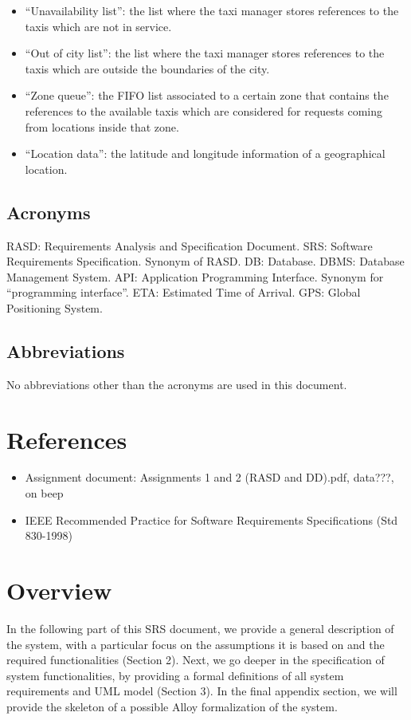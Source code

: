\begin{itemize}
\item “Unavailability list”: the list where the taxi manager stores references to the taxis which are not in service.
\item “Out of city list”: the list where the taxi manager stores references to the taxis which are outside the boundaries of the city. 
\item “Zone queue”: the FIFO list associated to a certain zone that contains the references to the available taxis which are considered for requests coming from locations inside that zone. 
\item “Location data”: the latitude and longitude information of a geographical location.
\end{itemize}


\subsection{Acronyms}
RASD: Requirements Analysis and Specification Document.
SRS: Software Requirements Specification. Synonym of RASD.
DB: Database.
DBMS: Database Management System.
API: Application Programming Interface. Synonym for “programming interface”.
ETA: Estimated Time of Arrival.
GPS: Global Positioning System.


\subsection{Abbreviations}
No abbreviations other than the acronyms are used in this document.


\section{References}
\begin{itemize}
\item Assignment document: Assignments 1 and 2 (RASD and DD).pdf, data???, on beep
\item IEEE Recommended Practice for Software Requirements Specifications (Std 830-1998)
\end{itemize}


\section{Overview}
In the following part of this SRS document, we provide a general description of the system, with a particular focus on the assumptions it is based on and the required functionalities (Section 2). Next, we go deeper in the specification of system functionalities, by providing a formal definitions of all system requirements and UML model (Section 3).
In the final appendix section, we will provide the skeleton of a possible Alloy formalization of the system. 

